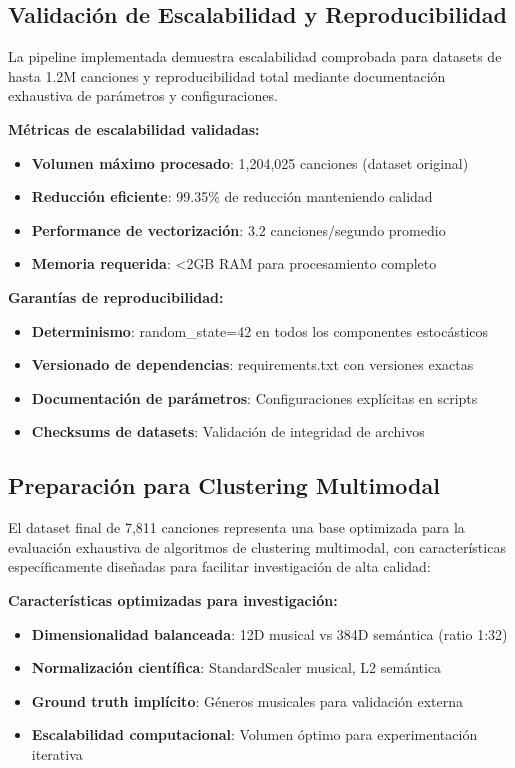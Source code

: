 \documentclass[12pt,a4paper]{article}
\begin{document}
\subsection{Validación de Escalabilidad y Reproducibilidad}

La pipeline implementada demuestra escalabilidad comprobada para datasets de hasta 1.2M canciones y reproducibilidad total mediante documentación exhaustiva de parámetros y configuraciones.

\textbf{Métricas de escalabilidad validadas:}
\begin{itemize}[leftmargin=*]
    \item \textbf{Volumen máximo procesado}: 1,204,025 canciones (dataset original)
    \item \textbf{Reducción eficiente}: 99.35\% de reducción manteniendo calidad
    \item \textbf{Performance de vectorización}: 3.2 canciones/segundo promedio
    \item \textbf{Memoria requerida}: <2GB RAM para procesamiento completo
\end{itemize}

\textbf{Garantías de reproducibilidad:}
\begin{itemize}[leftmargin=*]
    \item \textbf{Determinismo}: random\_state=42 en todos los componentes estocásticos
    \item \textbf{Versionado de dependencias}: requirements.txt con versiones exactas
    \item \textbf{Documentación de parámetros}: Configuraciones explícitas en scripts
    \item \textbf{Checksums de datasets}: Validación de integridad de archivos
\end{itemize}

\subsection{Preparación para Clustering Multimodal}

El dataset final de 7,811 canciones representa una base optimizada para la evaluación exhaustiva de algoritmos de clustering multimodal, con características específicamente diseñadas para facilitar investigación de alta calidad:

\textbf{Características optimizadas para investigación:}
\begin{itemize}[leftmargin=*]
    \item \textbf{Dimensionalidad balanceada}: 12D musical vs 384D semántica (ratio 1:32)
    \item \textbf{Normalización científica}: StandardScaler musical, L2 semántica
    \item \textbf{Ground truth implícito}: Géneros musicales para validación externa
    \item \textbf{Escalabilidad computacional}: Volumen óptimo para experimentación iterativa
\end{itemize}
\end{document}
